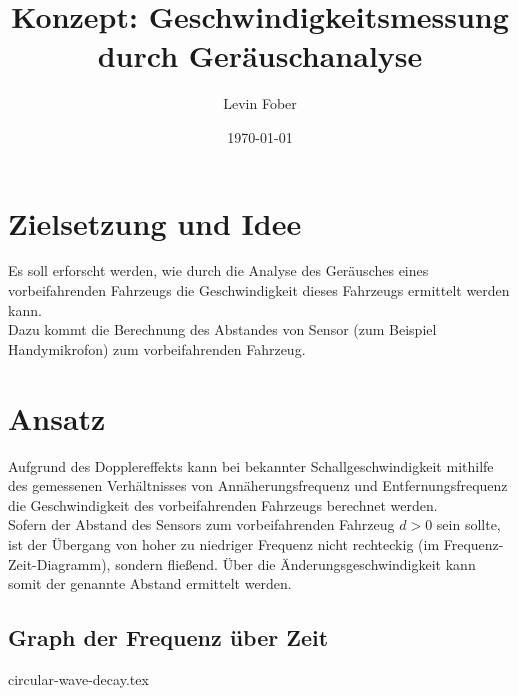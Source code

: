 \documentclass[12pt, a4paper]{article}
\title{Konzept: Geschwindigkeitsmessung durch Geräuschanalyse}
\author{Levin Fober}
\date{\today}
\begin{document}
\maketitle

\section{Zielsetzung und Idee}
Es soll erforscht werden, wie durch die Analyse des Geräusches eines
vorbeifahrenden Fahrzeugs die Geschwindigkeit dieses Fahrzeugs ermittelt werden
kann. \\
Dazu kommt die Berechnung des Abstandes von Sensor (zum Beispiel Handymikrofon)
zum vorbeifahrenden Fahrzeug.

\section{Ansatz}
Aufgrund des Dopplereffekts kann bei bekannter Schallgeschwindigkeit mithilfe
des gemessenen Verhältnisses von Annäherungsfrequenz und Entfernungsfrequenz die
Geschwindigkeit des vorbeifahrenden Fahrzeugs berechnet werden.\\
Sofern der Abstand des Sensors zum vorbeifahrenden Fahrzeug \(d > 0\) sein
sollte, ist der Übergang von hoher zu niedriger Frequenz nicht rechteckig (im
Frequenz-Zeit-Diagramm), sondern fließend. Über die Änderungsgeschwindigkeit
kann somit der genannte Abstand ermittelt werden.

\subsection{Graph der Frequenz über Zeit}
{circular-wave-decay.tex}
\end{document}
